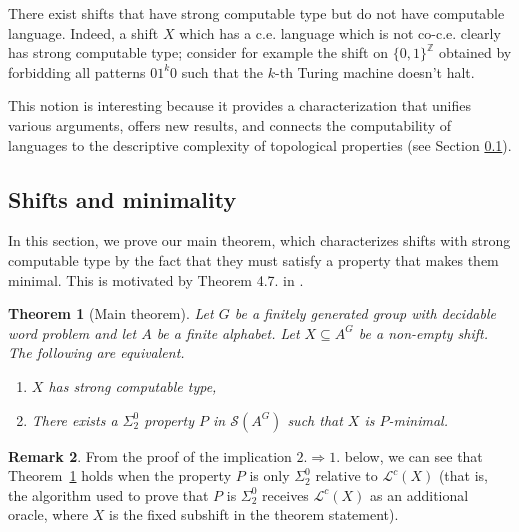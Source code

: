 \documentclass[french,american]{article}
\theoremstyle{plain}
\newtheorem{theorem}{Theorem}[section]
\theoremstyle{definition}
\newtheorem{remark}[theorem]{Remark}
\theoremstyle{remark}
\theoremstyle{plain}
\newcommand{\Z}{\mathbb{Z}}
\begin{document}
There exist shifts that have strong computable type but do not have
computable language. Indeed, a shift $X$ which has a c.e. language
which is not co-c.e. clearly has strong computable type; consider for example the shift on $\{0,1\}^\Z$ obtained by forbidding all patterns $01^k0$ such that the $k$-th Turing machine doesn't halt.

This notion is interesting because it provides a characterization
that unifies various arguments, offers new results, and connects the
computability of languages to the descriptive complexity of topological
properties (see Section \ref{subsec:Subshifts-and-minimality}).

\subsection{Shifts and minimality}\label{subsec:Subshifts-and-minimality}

In this section, we prove our main theorem, which characterizes shifts
with strong computable type by the fact that they must satisfy a property
that makes them minimal. This is motivated by Theorem
4.7. in \cite{AH22c}.

\begin{theorem}[Main theorem]
\label{thm:main}Let $G$ be a finitely generated group with
 decidable word problem and let $A$ be a finite alphabet. Let $X\subseteq A^{G}$
be a non-empty shift. The following are equivalent.
\begin{enumerate}
\item $X$ has strong computable type,
\item There exists a $\Sigma_{2}^{0}$ property $P$ in $\mathcal{S}(A^{G})$
such that $X$ is $P$-minimal.
\end{enumerate}
\end{theorem}


\begin{remark}
From the proof of the implication $2.\Rightarrow1.$ below, we can see that Theorem~\ref{thm:main} holds when the property $P$ is only $\Sigma_2^0$ relative to $\mathcal L^c(X)$ (that is, the algorithm used to prove that $P$ is $\Sigma_2^0$ receives $\mathcal L^c(X)$ as an additional oracle, where $X$ is the fixed subshift in the theorem statement).
\end{remark}
\end{document}

